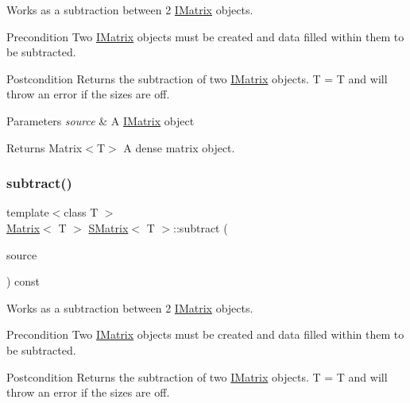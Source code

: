 Works as a subtraction between 2 \mbox{\hyperlink{class_i_matrix}{I\+Matrix}} objects. 

\begin{DoxyPrecond}{Precondition}
Two \mbox{\hyperlink{class_i_matrix}{I\+Matrix}} objects must be created and data filled within them to be subtracted. 
\end{DoxyPrecond}
\begin{DoxyPostcond}{Postcondition}
Returns the subtraction of two \mbox{\hyperlink{class_i_matrix}{I\+Matrix}} objects. T = T and will throw an error if the sizes are off.
\end{DoxyPostcond}

\begin{DoxyParams}{Parameters}
{\em source} & A \mbox{\hyperlink{class_i_matrix}{I\+Matrix}} object \\
\hline
\end{DoxyParams}
\begin{DoxyReturn}{Returns}
Matrix$<$\+T$>$ A dense matrix object. 
\end{DoxyReturn}
\mbox{\label{class_s_matrix_a5957e6d01d12d85141bb2ce3e3d55654}} 
\subsubsection{\texorpdfstring{subtract()}{subtract()}\hspace{0.1cm}{\footnotesize\ttfamily [3/6]}}
{\footnotesize\ttfamily template$<$class T $>$ \\
\mbox{\hyperlink{class_matrix}{Matrix}}$<$ T $>$ \mbox{\hyperlink{class_s_matrix}{S\+Matrix}}$<$ T $>$\+::subtract (\begin{DoxyParamCaption}\item[{const \mbox{\hyperlink{class_i_matrix}{I\+Matrix}}$<$ \mbox{\hyperlink{class_l_matrix}{L\+Matrix}}$<$ T $>$, T $>$ \&}]{source }\end{DoxyParamCaption}) const}



Works as a subtraction between 2 \mbox{\hyperlink{class_i_matrix}{I\+Matrix}} objects. 

\begin{DoxyPrecond}{Precondition}
Two \mbox{\hyperlink{class_i_matrix}{I\+Matrix}} objects must be created and data filled within them to be subtracted. 
\end{DoxyPrecond}
\begin{DoxyPostcond}{Postcondition}
Returns the subtraction of two \mbox{\hyperlink{class_i_matrix}{I\+Matrix}} objects. T = T and will throw an error if the sizes are off.
\end{DoxyPostcond}

